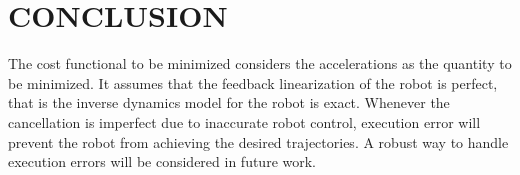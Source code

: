 \section{CONCLUSION}\label{end}


The cost functional to be minimized considers the accelerations as the quantity to be minimized. It assumes that the feedback linearization of the robot is perfect, that is the inverse dynamics model for the robot is exact. Whenever the cancellation is imperfect due to inaccurate robot control, execution error will prevent the robot from achieving the desired trajectories. A robust way to handle execution errors will be considered in future work.